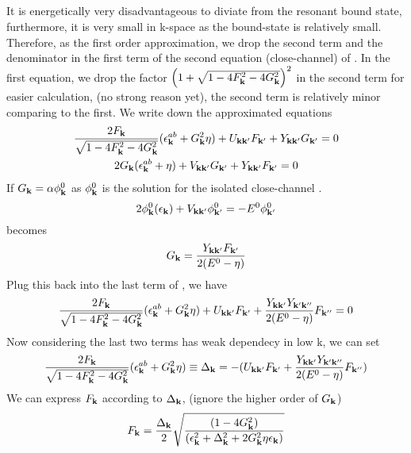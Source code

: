 \subsection{}
It is energetically very disadvantageous to diviate from the resonant bound state, furthermore, it is very small in k-space as the bound-state is relatively small.  Therefore, as the first order approximation, we drop the second term and the denominator in the first term of the second equation (close-channel) of .  In the first equation, we drop the factor $\left(1+\sqrt{1-4 F_{\mathbf{k}}^2-4 G_{\mathbf{k}}^2}\right)^2$ in the second term for easier calculation, (no strong reason yet), the second term is relatively minor comparing to the first. We write down the approximated equations
\begin{subequations}\label{eq:20100915:gap}
\begin{gather}\label{eq:20100915:gapa}
\frac{2F_{\mathbf{k}}}{\sqrt{1-4 F_{\mathbf{k}}^2-4 G_{\mathbf{k}}^2}} (\epsilon^{ab}_{\mathbf{k}}+  G_{\mathbf{k}}^2\eta)+U_{\mathbf{k}\mathbf{k}'}F_{\mathbf{k}'}+Y_{\mathbf{k}\mathbf{k}'}G_{\mathbf{k}'}=0\\
\label{eq:20100915:gapb}
{2G_{\ensuremath{\mathbf{k}}}}(\epsilon^{ab}_{\mathbf{k}}+\eta)+V_{\mathbf{k}\mathbf{k}'}G_{\mathbf{k}'}+Y_{\mathbf{k}\mathbf{k}'}F_{\mathbf{k}'}=0
\end{gather}
\end{subequations}
If $G_{\mathbf{k}}=\alpha\phi^{0}_{\mathbf{k}}$ as $\phi_{\mathbf{k}}^{0}$ is the solution for the isolated close-channel \sch.  
\[
{2\phi^{0}_{\mathbf{k}}}(\epsilon_{\mathbf{k}})+V_{\mathbf{k}\mathbf{k}'}\phi^{0}_{\mathbf{k}'}=-E^{0}\phi^{0}_{\mathbf{k}'}
\]
 becomes
\begin{equation}
G_{\mathbf{k}}=\frac{Y_{\mathbf{k}\mathbf{k}'}F_{\mathbf{k}'}}{2(E^{0}-\eta)}
\end{equation}
Plug this back into the last term of , we have 
\begin{equation}
\frac{2F_{\mathbf{k}}}{\sqrt{1-4 F_{\mathbf{k}}^2-4 G_{\mathbf{k}}^2}} (\epsilon^{ab}_{\mathbf{k}}+  G_{\mathbf{k}}^2\eta)+U_{\mathbf{k}\mathbf{k}'}F_{\mathbf{k}'}+\frac{Y_{\mathbf{k}\mathbf{k}'}Y_{\mathbf{k}'\mathbf{k}''}}{2(E^{0}-\eta)}F_{\mathbf{k}''}=0
\end{equation}
Now considering the last two terms has weak dependecy in low k, we can set 
\begin{equation}\label{eq:20100915:gap1}
\frac{2F_{\mathbf{k}}}{\sqrt{1-4 F_{\mathbf{k}}^2-4 G_{\mathbf{k}}^2}} (\epsilon^{ab}_{\mathbf{k}}+  G_{\mathbf{k}}^2\eta)\equiv\Delta_{\mathbf{k}}=-(U_{\mathbf{k}\mathbf{k}'}F_{\mathbf{k}'}+\frac{Y_{\mathbf{k}\mathbf{k}'}Y_{\mathbf{k}'\mathbf{k}''}}{2(E^{0}-\eta)}F_{\mathbf{k}''})
\end{equation}
We can express $F_{\mathbf{k}}$ according to $\Delta_{\mathbf{k}}$,  (ignore the higher order of $G_{\mathbf{k}}$)
\begin{equation}
F_{\mathbf{k}}=\frac{\Delta_{\mathbf{k}}}2\sqrt{\frac{(1-4G_{\mathbf{k}}^{2})}{(\epsilon_{\mathbf{k}}^{2}+\Delta_{\mathbf{k}}^{2}+2G_{\mathbf{k}}^{2}\eta\epsilon_{\mathbf{k}})}}
\end{equation}
